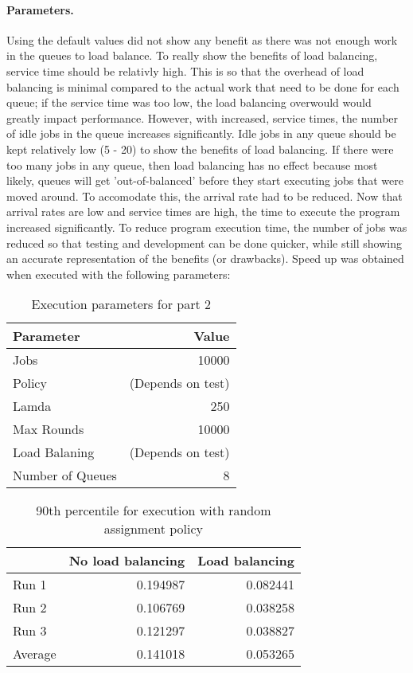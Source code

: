\documentclass[12pt]{article}
\begin{document}
\paragraph{Parameters.} Using the default values did not show any benefit as there was not enough work in the queues to load balance. To really show the benefits of load balancing, service time should be relativly high. This is so that the overhead of load balancing is minimal compared to the actual work that need to be done for each queue; if the service time was too low, the load balancing overwould would greatly impact performance. However, with increased, service times, the number of idle jobs in the queue increases significantly. Idle jobs in any queue should be kept relatively low (5 - 20) to show the benefits of load balancing. If there were too many jobs in any queue, then load balancing has no effect because most likely, queues will get 'out-of-balanced' before they start executing jobs that were moved around. To accomodate this, the arrival rate had to be reduced. Now that arrival rates are low and service times are high, the time to execute the program increased significantly. To reduce program execution time, the number of jobs was reduced so that testing and development can be done quicker, while still showing an accurate representation of the benefits (or drawbacks). Speed up was obtained when executed with the following parameters:
\begin{table}[H]
  \centering
  \begin{tabular}{lr}
    {\bf Parameter} & {\bf Value} \\
    \hline
    Jobs & 10000 \\
    Policy & (Depends on test) \\
    Lamda & 250 \\
    Max Rounds & 10000 \\
    Load Balaning & (Depends on test) \\
    Number of Queues & 8 \\
  \end{tabular}
  \caption{Execution parameters for part 2}
  \label{tbl-part2-params}
\end{table}

\begin{table}[H]
  \centering
  \begin{tabular}{lrr}
    & {\bf No load balancing} & {\bf Load balancing}} \\
    \hline
    Run 1 & 0.194987 & 0.082441 \\
    Run 2 & 0.106769 & 0.038258 \\
    Run 3 & 0.121297 & 0.038827 \\
    \hline
    Average & 0.141018 & 0.053265 \\
  \end{tabular}
  \caption{90th percentile for execution with random assignment policy}
  \label{tbl-part2-originall}
\end{table}
\end{document}
